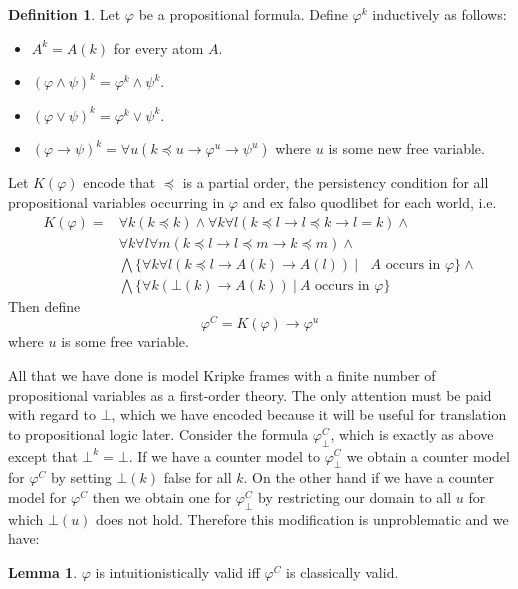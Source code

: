 \documentclass[a4paper,12pt]{report}
\theoremstyle{definition}
\theoremstyle{definition}
\theoremstyle{definition}
\newtheorem{lemma}[theorem]{Lemma}
\theoremstyle{definition}
\theoremstyle{definition}
\newtheorem{definition}[theorem]{Definition}
\theoremstyle{definition}
\theoremstyle{definition}
\begin{document}
	\begin{definition}
		Let $\varphi$ be a propositional formula. Define $\varphi^{k}$ inductively as follows:
		\begin{itemize}
			\item $A^{k} = A(k)$ for every atom $A$.
			\item $(\varphi\wedge\psi)^k = \varphi^k\wedge\psi^k$.
			\item $(\varphi\vee\psi)^k = \varphi^k\vee\psi^k$.
			\item $(\varphi\to \psi)^k = \forall u(k\preceq u\to\varphi^{u}\to\psi^{u})$ where $u$ is some new free variable.
		\end{itemize}
		Let $K(\varphi)$ encode that $\preceq$ is a partial order, the persistency condition for all propositional variables occurring in $\varphi$ and ex falso quodlibet for each world, i.e.
		\begin{align*}
			K(\varphi) = &\forall k(k\preceq k)\wedge \forall k\forall l(k\preceq l\to l\preceq k\to l = k) \wedge \\&\forall k\forall l\forall m(k\preceq l \to l\preceq m\to k\preceq m)\wedge\\&\bigwedge \{\forall k\forall l(k\preceq l\to A(k)\to A(l))\:|\: \text{ $A$ occurs in $\varphi$}\}\wedge\\&\bigwedge\{\forall k(\bot(k)\to A(k))\:|\: A \text{ occurs in }\varphi\}
		\end{align*}
		Then define
		$$\varphi^{C} = K(\varphi)\to \varphi^{u}$$
		where $u$ is some free variable.
	\end{definition}

	All that we have done is model Kripke frames with a finite number of propositional variables as a first-order theory. The only attention must be paid with regard to $\bot$, which we have encoded because it will be useful for translation to propositional logic later. Consider the formula $\varphi^C_\bot$, which is exactly as above except that $\bot^k = \bot$. If we have a counter model to $\varphi^C_\bot$ we obtain a counter model for $\varphi^C$ by setting $\bot(k)$ false for all $k$. On the other hand if we have a counter model for $\varphi^C$ then we obtain one for $\varphi^C_\bot$ by restricting our domain to all $u$ for which $\bot(u)$ does not hold. Therefore this modification is unproblematic and we have:

	\begin{lemma}
		$\varphi$ is intuitionistically valid iff $\varphi^C$ is classically valid.
	\end{lemma}
\end{document}
